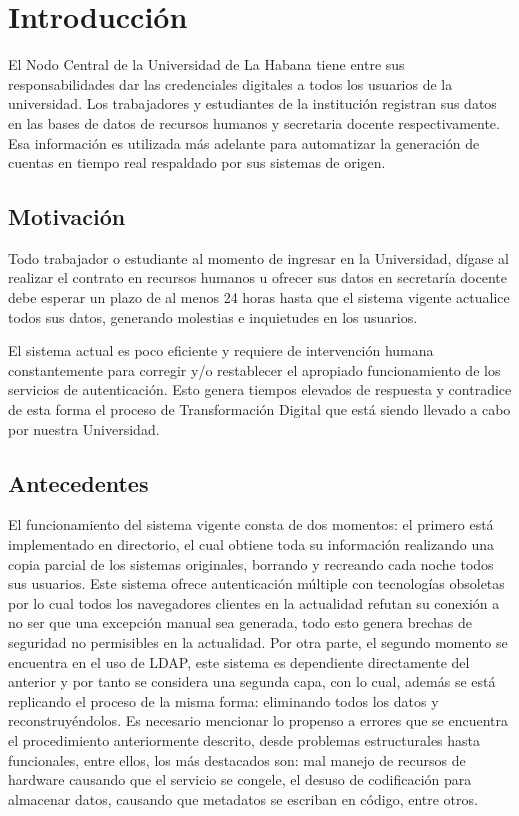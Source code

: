 \chapter*{Introducción}\label{chapter:introduction}
El Nodo Central de la Universidad de La Habana tiene entre sus responsabilidades dar  las credenciales  digitales a todos los usuarios de la universidad. Los trabajadores y estudiantes de la instituci\'on registran sus datos en las bases de datos de recursos humanos y secretaria docente respectivamente. Esa informaci\'on  es utilizada m\'as adelante para automatizar la generación de cuentas en tiempo real respaldado por sus sistemas de origen.


\section*{Motivación}
Todo trabajador o estudiante al momento de ingresar en la Universidad, dígase al realizar el contrato en recursos humanos u ofrecer sus datos en secretaría docente debe esperar un plazo de al menos 24 horas hasta que el sistema vigente actualice todos sus datos, generando molestias e inquietudes en los usuarios.

El sistema actual es poco eficiente y requiere de intervención humana constantemente para corregir y/o restablecer el apropiado funcionamiento de los servicios de autenticación. Esto genera tiempos elevados de respuesta y contradice de esta forma el proceso de Transformación Digital que está siendo llevado a cabo por nuestra Universidad.

\section*{Antecedentes}
El funcionamiento del sistema vigente consta de dos momentos: el primero está implementado en directorio, el cual obtiene toda su información realizando una copia parcial de los sistemas originales, borrando y recreando cada noche todos sus usuarios. Este sistema ofrece autenticación múltiple con tecnologías obsoletas por lo cual todos los navegadores clientes en la actualidad refutan su conexión a no ser que una excepción manual sea generada, todo esto genera brechas de seguridad no permisibles en la actualidad. Por otra parte, el segundo momento se encuentra en el uso de LDAP, este sistema es dependiente directamente del anterior y por tanto se considera una segunda capa, con lo cual, además se está replicando el proceso de la misma forma: eliminando todos los datos y reconstruyéndolos. Es necesario mencionar lo propenso a errores que se encuentra el procedimiento anteriormente descrito, desde problemas estructurales hasta funcionales, entre ellos, los más destacados son: mal manejo de recursos de hardware causando que el servicio se congele, el desuso de codificación para almacenar datos, causando que metadatos se escriban en código, entre otros.
